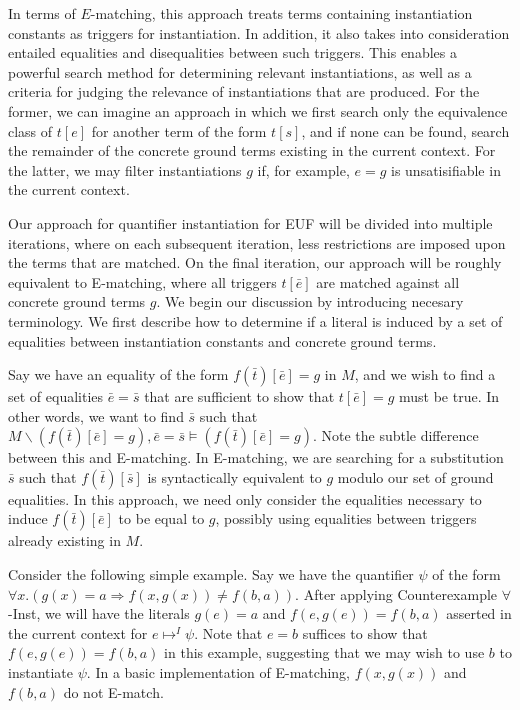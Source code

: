 \documentclass{llncs}
\begin{document}
In terms of $E$-matching, this approach treats terms containing instantiation constants as triggers for instantiation.
In addition, it also takes into consideration entailed equalities and disequalities between such triggers.
This enables a powerful search method for determining relevant instantiations, as well as a criteria for judging the relevance of instantiations that are produced.
For the former, we can imagine an approach in which we first search only the equivalence class of $t[e]$ for another term of the form $t[s]$, and if none can be found, search the remainder of the concrete ground terms existing in the current context.
For the latter, we may filter instantiations $g$ if, for example, $e = g$ is unsatisifiable in the current context.

Our approach for quantifier instantiation for EUF will be divided into multiple iterations, where on each subsequent iteration, less restrictions are imposed upon the terms that are matched.
On the final iteration, our approach will be roughly equivalent to E-matching, where all triggers $t[\bar{e}]$ are matched against all concrete ground terms $g$.
We begin our discussion by introducing necesary terminology.
We first describe how to determine if a literal is induced by a set of equalities between instantiation constants and concrete ground terms.

Say we have an equality of the form $f( \bar{t} )[\bar{e}] = g$ in $M$, and we wish to find a set of equalities $\bar{e} = \bar{s}$ that are sufficient to show that $t[\bar{e}] = g$ must be true.
In other words, we want to find $\bar{s}$ such that $M \backslash (f( \bar{t} )[\bar{e}] = g), \bar{e} = \bar{s} \models (f( \bar{t} )[\bar{e}] = g)$.
Note the subtle difference between this and E-matching.
In E-matching, we are searching for a substitution $\bar{s}$ such that $f( \bar{t} )[\bar{s}]$ is syntactically equivalent to $g$ modulo our set of ground equalities.
In this approach, we need only consider the equalities necessary to induce $f( \bar{t} )[\bar{e}]$ to be equal to $g$, possibly using equalities between triggers already existing in $M$.

Consider the following simple example.
Say we have the quantifier $\psi$ of the form $\forall x. (g(x) = a \Rightarrow f( x, g( x ) ) \neq f( b, a ))$.
After applying Counterexample $\forall$-Inst, we will have the literals $g(e) = a$ and $f( e, g( e ) ) = f( b, a )$ asserted in the current context for $e \mapsto^I \psi$.
Note that $e = b$ suffices to show that $f( e, g( e ) ) = f( b, a )$ in this example, suggesting that we may wish to use $b$ to instantiate $\psi$.
In a basic implementation of E-matching, $f( x, g( x ) )$ and $f( b, a )$ do not E-match.
\end{document}
